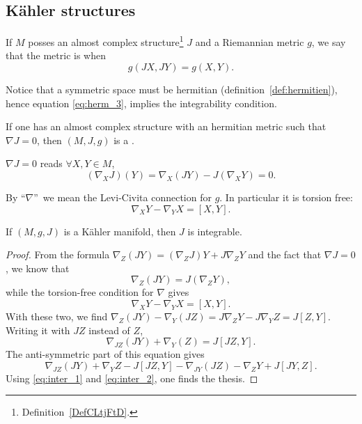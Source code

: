 \subsection{Kähler structures}

\begin{definition}  \label{DefKONtphK}
	If $M$ posses an almost complex structure\footnote{Definition~\ref{DefCLtjFtD}.} $J$ and a Riemannian metric $g$, we say that the metric is  when
	\begin{equation}
		g(JX,JY)=g(X,Y).
	\end{equation}
\end{definition}

Notice that a symmetric space must be hermitian (definition~\ref{def:hermitien}), hence equation \eqref{eq:herm_3}, implies the integrability condition.

\begin{definition}
	If one has an almost complex structure with an hermitian metric such that $\nabla J=0$, then $(M,J,g)$ is a .
\end{definition}

\begin{remark}
	$\nabla J=0$ reads $\forall X,Y\in M$,
	\[
		(\nabla_XJ)(Y)=\nabla_X(JY)-J(\nabla_XY)=0.
	\]
\end{remark}

\begin{remark}
	By ``$\nabla$''\ we mean the Levi-Civita connection for $g$. In particular it is torsion free:
	\[
		\nabla_XY-\nabla_YX=[X,Y].
	\]
\end{remark}

\begin{lemma}
	If $(M,g,J)$ is a Kähler manifold, then $J$ is integrable.
\end{lemma}

\begin{proof}
	From the formula $\nabla_Z(JY)=(\nabla_ZJ)Y+J\nabla_ZY$ and the fact that $\nabla J=0$, we know that
	\begin{equation}\label{eq:inter_1}
		\nabla_Z(JY)=J(\nabla_ZY),
	\end{equation}
	while the torsion-free condition for $\nabla$ gives
	\begin{equation}\label{eq:inter_2}
		\nabla_XY-\nabla_YX=[X,Y].
	\end{equation}
	With these two, we find $\nabla_Z(JY)-\nabla_Y(JZ)=J\nabla_ZY-J\nabla_YZ=J[Z,Y]$.  Writing it with $JZ$ instead of $Z$,
	\[
		\nabla_{JZ}(JY)+\nabla_Y(Z)=J[JZ,Y].
	\]
	The anti-symmetric part of this equation gives
	\[
		\nabla_{JZ}(JY)+\nabla_YZ-J[JZ,Y]-\nabla_{JY}(JZ)-\nabla_ZY+J[JY,Z].
	\]
	Using \eqref{eq:inter_1} and \eqref{eq:inter_2}, one finds the thesis.

\end{proof}

